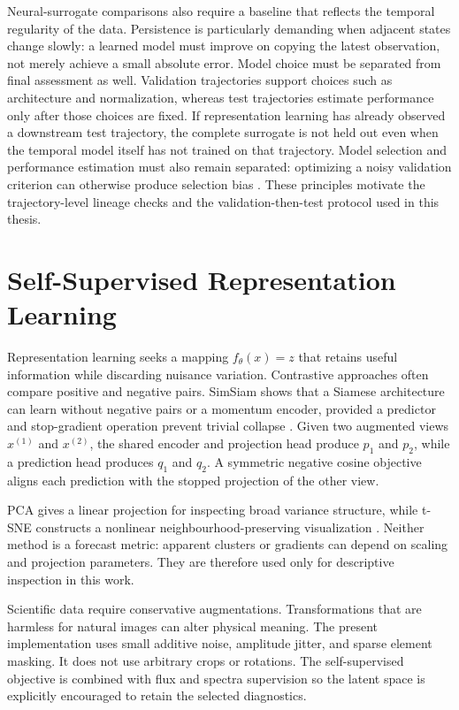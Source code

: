 Neural-surrogate comparisons also require a baseline that reflects the temporal regularity of the
data. Persistence is particularly demanding when adjacent states change slowly: a learned model
must improve on copying the latest observation, not merely achieve a small absolute error. Model
choice must be separated from final assessment as well. Validation trajectories support choices
such as architecture and normalization, whereas test trajectories estimate performance only after
those choices are fixed. If representation learning has already observed a downstream test
trajectory, the complete surrogate is not held out even when the temporal model itself has not
trained on that trajectory. Model selection and performance estimation must also remain separated:
optimizing a noisy validation criterion can otherwise produce selection bias
\citep{varma2006crossvalidation,cawley2010selectionbias}. These principles motivate the trajectory-level lineage checks and the
validation-then-test protocol used in this thesis.

\section{Self-Supervised Representation Learning}

Representation learning seeks a mapping $f_\theta(x)=z$ that retains useful information while
discarding nuisance variation. Contrastive approaches often compare positive and negative pairs.
SimSiam shows that a Siamese architecture can learn without negative pairs or a momentum encoder,
provided a predictor and stop-gradient operation prevent trivial collapse
\citep{chen2021simsiam}. Given two augmented views $x^{(1)}$ and $x^{(2)}$, the shared encoder and
projection head produce $p_1$ and $p_2$, while a prediction head produces $q_1$ and $q_2$. A
symmetric negative cosine objective aligns each prediction with the stopped projection of the
other view.

PCA gives a linear projection for inspecting broad variance structure, while t-SNE constructs a
nonlinear neighbourhood-preserving visualization \citep{vandermaaten2008tsne}. Neither method is a
forecast metric: apparent clusters or gradients can depend on scaling and projection parameters.
They are therefore used only for descriptive inspection in this work.

Scientific data require conservative augmentations. Transformations that are harmless for natural
images can alter physical meaning. The present implementation uses small additive noise, amplitude
jitter, and sparse element masking. It does not use arbitrary crops or rotations. The
self-supervised objective is combined with flux and spectra supervision so the latent space is
explicitly encouraged to retain the selected diagnostics.

